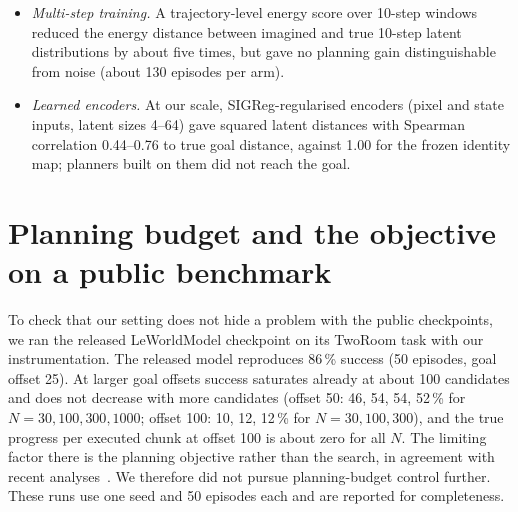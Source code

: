 \documentclass[preprint,12pt]{elsarticle}
\begin{document}
\begin{itemize}
\item \emph{Multi-step training.} A trajectory-level energy score over 10-step windows reduced the energy distance between imagined and true 10-step latent distributions by about five times, but gave no planning gain distinguishable from noise (about 130 episodes per arm).
\item \emph{Learned encoders.} At our scale, SIGReg-regularised encoders (pixel and state inputs, latent sizes 4--64) gave squared latent distances with Spearman correlation 0.44--0.76 to true goal distance, against 1.00 for the frozen identity map; planners built on them did not reach the goal.
\end{itemize}

\section{Planning budget and the objective on a public benchmark}\label{sec:lewm}
To check that our setting does not hide a problem with the public checkpoints, we ran the released LeWorldModel checkpoint on its TwoRoom task with our instrumentation.
The released model reproduces 86\,\% success (50 episodes, goal offset 25).
At larger goal offsets success saturates already at about 100 candidates and does not decrease with more candidates (offset 50: 46, 54, 54, 52\,\% for $N=30,100,300,1000$; offset 100: 10, 12, 12\,\% for $N=30,100,300$), and the true progress per executed chunk at offset 100 is about zero for all $N$.
The limiting factor there is the planning objective rather than the search, in agreement with recent analyses~\cite{objective2026,anchored2026}.
We therefore did not pursue planning-budget control further.
These runs use one seed and 50 episodes each and are reported for completeness.

\end{document}
